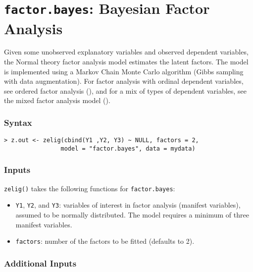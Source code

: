 \section{\texttt{factor.bayes}: Bayesian Factor Analysis}\label{factor.bayes}

Given some unobserved explanatory variables and observed dependent
variables, the Normal theory factor analysis model estimates the
latent factors.  The model is implemented using a Markov Chain Monte
Carlo algorithm (Gibbs sampling with data augmentation).  For factor
analysis with ordinal dependent variables, see ordered factor analysis
(), and for a mix of types of dependent variables,
see the mixed factor analysis model ().

\subsubsection{Syntax}
\begin{verbatim}
> z.out <- zelig(cbind(Y1 ,Y2, Y3) ~ NULL, factors = 2, 
                model = "factor.bayes", data = mydata)
\end{verbatim}

\subsubsection{Inputs}
{\tt zelig()} takes the following functions for {\tt factor.bayes}:  
\begin{itemize}
\item \texttt{Y1}, {\tt Y2}, and \texttt{Y3}: variables of interest in 
factor analysis (manifest variables), assumed to be normally
distributed. The model requires a minimum of three manifest variables.

\item \texttt{factors}: number of the factors to be fitted (defaults to 2).

\end{itemize}

\subsubsection{Additional Inputs}

